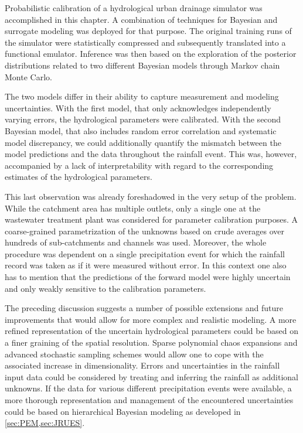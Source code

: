 Probabilistic calibration of a hydrological urban drainage simulator was accomplished in this chapter.
A combination of techniques for Bayesian and surrogate modeling was deployed for that purpose.
The original training runs of the simulator were statistically compressed and subsequently translated into a functional emulator.
Inference was then based on the exploration of the posterior distributions related to two different Bayesian models through Markov chain Monte Carlo.
\par %
The two models differ in their ability to capture measurement and modeling uncertainties.
With the first model, that only acknowledges independently varying errors, the hydrological parameters were calibrated.
With the second Bayesian model, that also includes random error correlation and systematic model discrepancy,
we could additionally quantify the mismatch between the model predictions and the data throughout the rainfall event.
This was, however, accompanied by a lack of interpretability with regard to the corresponding estimates of the hydrological parameters.
\par %
This last observation was already foreshadowed in the very setup of the problem.
While the catchment area has multiple outlets, only a single one at the wastewater treatment plant was considered for parameter calibration purposes.
A coarse-grained parametrization of the unknowns based on crude averages over hundreds of sub-catchments and channels was used.
Moreover, the whole procedure was dependent on a single precipitation event for which the rainfall record was taken as if it were measured without error.
In this context one also has to mention that the predictions of the forward model were highly uncertain and only weakly sensitive to the calibration parameters.
\par %
The preceding discussion suggests a number of possible extensions and future improvements that would allow for more complex and realistic modeling.
A more refined representation of the uncertain hydrological parameters could be based on a finer graining of the spatial resolution.
Sparse polynomial chaos expansions and advanced stochastic sampling schemes would allow one to cope with the associated increase in dimensionality.
Errors and uncertainties in the rainfall input data could be considered by treating and inferring the rainfall as additional unknowns.
If the data for various different precipitation events were available,
a more thorough representation and management of the encountered uncertainties could be based on hierarchical Bayesian modeling as developed in \cref{sec:PEM,sec:JRUES}.